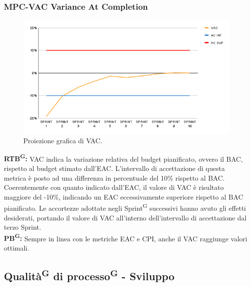 \documentclass[8pt]{article}
\newcommand{\glossterm}[1]{#1\textsuperscript{G}} %
\begin{document}
\subsubsection{MPC-VAC Variance At Completion}
\begin{figure}[h!]
    \centering
    \includegraphics[width=1\textwidth]{images_pdq/VAC.png}
    \caption{Proiezione grafica di VAC.}
    \label{fig:Proiezione grafica di VAC}
\end{figure}
\textbf{\glossterm{RTB}:} VAC indica la variazione relativa del budget pianificato, ovvero il BAC, rispetto al budget stimato dall'EAC. L'intervallo di accettazione di questa metrica è posto ad una differenza in percentuale del 10\% rispetto al BAC.\\
Coerentemente con quanto indicato dall'EAC, il valore di VAC è risultato maggiore del -10\%, indicando un EAC eccessivamente superiore rispetto al BAC pianificato. Le accortezze adottate negli \glossterm{Sprint} successivi hanno avuto gli effetti desiderati, portando il valore di VAC all'interno dell'intervallo di accettazione dal terzo Sprint.\\
\textbf{\glossterm{PB}:} Sempre in linea con le metriche EAC e CPI, anche il VAC raggiunge valori ottimali.
\subsection{\glossterm{Qualità} di \glossterm{processo} - Sviluppo}
\end{document}
